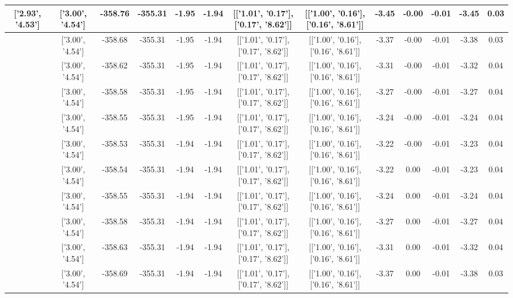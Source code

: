 \begin{table}[htbp]
\begin{adjustbox}{angle=90}
\begin{tabular}{|c|c|c|c|c|c|c|c|c|c|c|c|c|}
 ['2.93', '4.53'] & ['3.00', '4.54'] & -358.76 & -355.31 & -1.95 & -1.94 & [['1.01', '0.17'], ['0.17', '8.62']] & [['1.00', '0.16'], ['0.16', '8.61']] & -3.45 & -0.00 & -0.01 & -3.45 & 0.03\\ \hline
 ['2.94', '4.53'] & ['3.00', '4.54'] & -358.68 & -355.31 & -1.95 & -1.94 & [['1.01', '0.17'], ['0.17', '8.62']] & [['1.00', '0.16'], ['0.16', '8.61']] & -3.37 & -0.00 & -0.01 & -3.38 & 0.03\\ \hline
 ['2.96', '4.54'] & ['3.00', '4.54'] & -358.62 & -355.31 & -1.95 & -1.94 & [['1.01', '0.17'], ['0.17', '8.62']] & [['1.00', '0.16'], ['0.16', '8.61']] & -3.31 & -0.00 & -0.01 & -3.32 & 0.04\\ \hline
 ['2.97', '4.54'] & ['3.00', '4.54'] & -358.58 & -355.31 & -1.95 & -1.94 & [['1.01', '0.17'], ['0.17', '8.62']] & [['1.00', '0.16'], ['0.16', '8.61']] & -3.27 & -0.00 & -0.01 & -3.27 & 0.04\\ \hline
 ['2.98', '4.54'] & ['3.00', '4.54'] & -358.55 & -355.31 & -1.95 & -1.94 & [['1.01', '0.17'], ['0.17', '8.62']] & [['1.00', '0.16'], ['0.16', '8.61']] & -3.24 & -0.00 & -0.01 & -3.24 & 0.04\\ \hline
 ['2.99', '4.54'] & ['3.00', '4.54'] & -358.53 & -355.31 & -1.94 & -1.94 & [['1.01', '0.17'], ['0.17', '8.62']] & [['1.00', '0.16'], ['0.16', '8.61']] & -3.22 & -0.00 & -0.01 & -3.23 & 0.04\\ \hline
 ['3.00', '4.54'] & ['3.00', '4.54'] & -358.54 & -355.31 & -1.94 & -1.94 & [['1.01', '0.17'], ['0.17', '8.62']] & [['1.00', '0.16'], ['0.16', '8.61']] & -3.22 & 0.00 & -0.01 & -3.23 & 0.04\\ \hline
 ['3.02', '4.54'] & ['3.00', '4.54'] & -358.55 & -355.31 & -1.94 & -1.94 & [['1.01', '0.17'], ['0.17', '8.62']] & [['1.00', '0.16'], ['0.16', '8.61']] & -3.24 & 0.00 & -0.01 & -3.24 & 0.04\\ \hline
 ['3.03', '4.54'] & ['3.00', '4.54'] & -358.58 & -355.31 & -1.94 & -1.94 & [['1.01', '0.17'], ['0.17', '8.62']] & [['1.00', '0.16'], ['0.16', '8.61']] & -3.27 & 0.00 & -0.01 & -3.27 & 0.04\\ \hline
 ['3.04', '4.54'] & ['3.00', '4.54'] & -358.63 & -355.31 & -1.94 & -1.94 & [['1.01', '0.17'], ['0.17', '8.62']] & [['1.00', '0.16'], ['0.16', '8.61']] & -3.31 & 0.00 & -0.01 & -3.32 & 0.04\\ \hline
 ['3.05', '4.54'] & ['3.00', '4.54'] & -358.69 & -355.31 & -1.94 & -1.94 & [['1.01', '0.17'], ['0.17', '8.62']] & [['1.00', '0.16'], ['0.16', '8.61']] & -3.37 & 0.00 & -0.01 & -3.38 & 0.03\\ \hline

\end{tabular}
\end{adjustbox}
\end{table}

